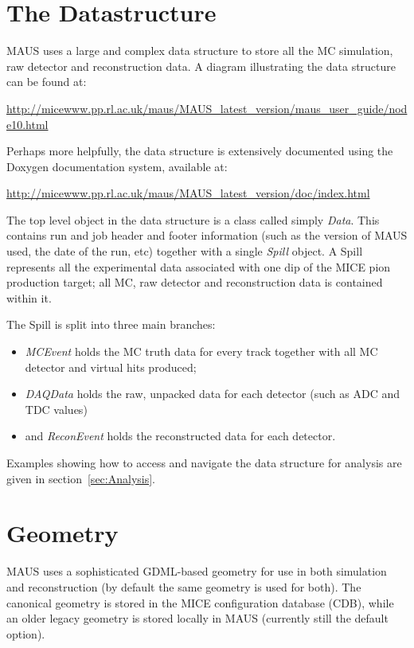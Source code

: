 \documentclass[a4paper,10pt]{article}
\begin{document}
\section{The Datastructure}
\label{sec:Datastructure}

MAUS uses a large and complex data structure to store all the MC simulation, raw detector and reconstruction data.  A diagram illustrating the data structure can be found at:

\url{http://micewww.pp.rl.ac.uk/maus/MAUS_latest_version/maus_user_guide/node10.html}

Perhaps more helpfully, the data structure is extensively documented using the Doxygen documentation system, available at:

\url{http://micewww.pp.rl.ac.uk/maus/MAUS_latest_version/doc/index.html}

The top level object in the data structure is a class called simply \textit{Data}. This contains run and job header and footer information (such as the version of MAUS used, the date of the run, etc) together with a single \textit{Spill} object. A Spill represents all the experimental data associated with one dip of the MICE pion production target; all MC, raw detector and reconstruction data is contained within it.

The Spill is split into three main branches: 

\begin{itemize}
  \item \textit{MCEvent} holds the MC truth data for every track together with all MC detector and virtual hits produced;
  \item \textit{DAQData} holds the raw, unpacked data for each detector (such as ADC and TDC values)
  \item and \textit{ReconEvent} holds the reconstructed data for each detector.
\end{itemize}

Examples showing how to access and navigate the data structure for analysis are given in section~\ref{sec:Analysis}.

\section{Geometry}
\label{sec:Geometry}
MAUS uses a sophisticated GDML-based geometry for use in both simulation and reconstruction (by default the same geometry is used for both).  The canonical geometry is stored in the MICE configuration database (CDB), while an older legacy geometry is stored locally in MAUS (currently still the default option).
\end{document}
